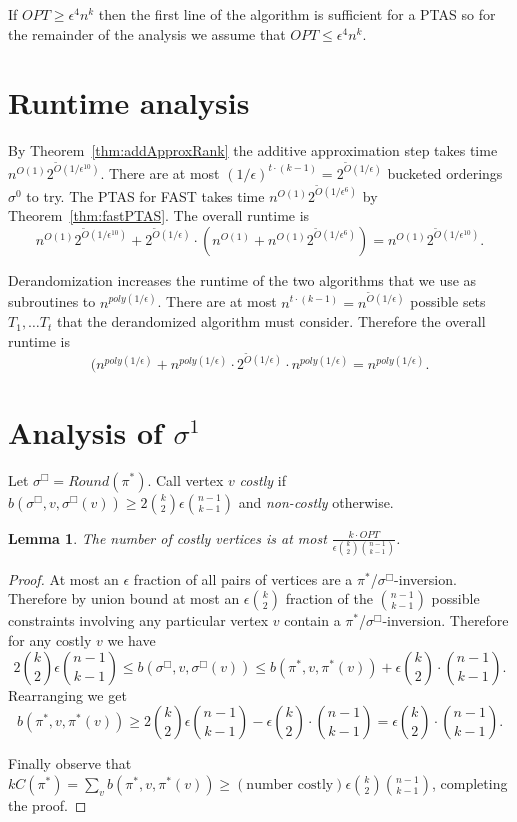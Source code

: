 \documentclass[dvips,11pt,letter]{article}
\newtheorem{lemma}[theorem]{Lemma}
\newcommand{\roundOpt}{\sigma^{\Box}}
\newcommand{\costlyB}{2 \binom{k}{2} \epsilon \binom{n-1}{k-1}}
\begin{document}
If $OPT \ge \epsilon^4 n^k$ then the first line of the algorithm is sufficient for a PTAS so for the remainder of the analysis we assume that $OPT \le \epsilon^4 n^k$. 

\section{Runtime analysis} \label{sec:runtime}

By Theorem~\ref{thm:addApproxRank} the additive approximation step takes time $n^{O(1)} 2^{\tilde O(1/\epsilon^{10})}$. There are at most $(1/\epsilon)^{t \cdot (k-1)} = 2^{\tilde O(1/\epsilon)}$ bucketed orderings $\sigma^0$ to try. The PTAS for FAST takes time $n^{O(1)} 2^{\tilde O(1/\epsilon^6)}$ by Theorem~\ref{thm:fastPTAS}. The overall runtime is 
\[
n^{O(1)} 2^{\tilde O(1/\epsilon^{10})} + 2^{\tilde O(1/\epsilon)} \cdot \left(n^{O(1)} + n^{O(1)} 2^{\tilde O(1/\epsilon^6)} \right) = n^{O(1)} 2^{\tilde O(1/\epsilon^{10})}
.\]

Derandomization increases the runtime of the two algorithms that we use as subroutines to $n^{poly(1/\epsilon)}$. There are at most $n^{t \cdot (k-1)} = n^{\tilde O(1/\epsilon)}$ possible sets $T_1,\ldots T_t$ that the derandomized algorithm must consider. Therefore the overall runtime is 
\[(n^{poly(1/\epsilon)} + n^{poly(1/\epsilon)}\cdot 2^{\tilde O(1/\epsilon)} \cdot n^{poly(1/\epsilon)}=n^{poly(1/\epsilon)}
.\]

\section{Analysis of $\sigma^1$} \label{sec:sigmaOne}

Let $\roundOpt = Round(\pi^*)$.
Call vertex $v$ \emph{costly} if $b(\roundOpt, v, \roundOpt(v)) \ge \costlyB$ and \emph{non-costly} otherwise.

\begin{lemma}\label{lem:fewCostly}
The number of costly vertices is at most $\frac{k \cdot OPT}{\epsilon \binom{k}{2} \binom{n-1}{k-1}}$.
\end{lemma}

\begin{proof}At most an $\epsilon$ fraction of all pairs of vertices are a $\pi^*$/$\roundOpt$-inversion. Therefore by union bound at most an $\epsilon \binom{k}{2}$ fraction of the $\binom{n-1}{k-1}$ possible constraints involving any particular vertex $v$ contain a $\pi^*$/$\roundOpt$-inversion. Therefore for any costly $v$ we have
\[
\costlyB \le b(\roundOpt, v, \roundOpt(v)) \le b(\pi^*, v, \pi^*(v)) + \epsilon \binom{k}{2} \cdot \binom{n-1}{k-1} 
.\]
Rearranging we get
\[
b(\pi^*, v, \pi^*(v)) \ge \costlyB - \epsilon \binom{k}{2} \cdot \binom{n-1}{k-1} = \epsilon \binom{k}{2} \cdot \binom{n-1}{k-1}
.\]

Finally observe that $k C(\pi^*) = \sum_v b(\pi^*, v, \pi^*(v)) \ge (\text{number costly}) \epsilon \binom{k}{2} \binom{n-1}{k-1}$, completing the proof.
\end{proof}
\end{document}
